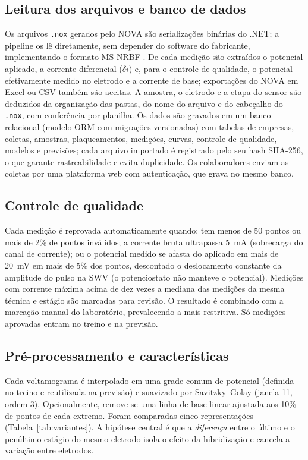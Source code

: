 \subsection{Leitura dos arquivos e banco de dados}
Os arquivos \texttt{.nox} gerados pelo NOVA são serializações binárias do .NET; a pipeline os lê
diretamente, sem depender do software do fabricante, implementando o formato MS-NRBF
\citep{msnrbf}. De cada medição são extraídos o potencial aplicado, a corrente diferencial
($\delta i$) e, para o controle de qualidade, o potencial efetivamente medido no eletrodo e a
corrente de base; exportações do NOVA em Excel ou CSV também são aceitas. A amostra, o eletrodo e a
etapa do sensor são deduzidos da organização das pastas, do nome do arquivo e do cabeçalho do
\texttt{.nox}, com conferência por planilha. Os dados são gravados em um banco relacional (modelo
ORM com migrações versionadas) com tabelas de empresas, coletas, amostras, plaqueamentos,
medições, curvas, controle de qualidade, modelos e previsões; cada arquivo importado é registrado
pelo seu hash SHA-256, o que garante rastreabilidade e evita duplicidade. Os colaboradores enviam
as coletas por uma plataforma web com autenticação, que grava no mesmo banco.

\subsection{Controle de qualidade}
Cada medição é reprovada automaticamente quando: tem menos de 50 pontos ou mais de 2\% de pontos
inválidos; a corrente bruta ultrapassa 5~mA (sobrecarga do canal de corrente); ou o potencial
medido se afasta do aplicado em mais de 20~mV em mais de 5\% dos pontos, descontado o
deslocamento constante da amplitude do pulso na SWV (o potenciostato não manteve o potencial). Medições com corrente máxima acima de dez vezes a mediana das medições da mesma técnica
e estágio são marcadas para revisão. O resultado é combinado com a marcação manual do laboratório,
prevalecendo a mais restritiva. Só medições aprovadas entram no treino e na previsão.

\subsection{Pré-processamento e características}
Cada voltamograma é interpolado em uma grade comum de potencial (definida no treino e reutilizada
na previsão) e suavizado por Savitzky--Golay \citep{savitzky1964} (janela 11, ordem 3).
Opcionalmente, remove-se uma linha de base linear ajustada aos 10\% de pontos de cada extremo.
Foram comparadas cinco representações (Tabela~\ref{tab:variantes}). A hipótese central é que a
\emph{diferença} entre o último e o penúltimo estágio do mesmo eletrodo isola o efeito da
hibridização e cancela a variação entre eletrodos.

